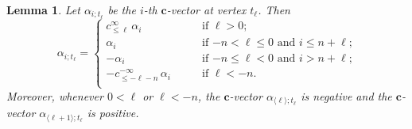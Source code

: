\documentclass[12pt]{amsart}
\newcommand{\bfc}{\mathbf{c}}
\newcommand{\cv}{\alpha}
\renewcommand{\mod}[1]{\langle {#1} \rangle}
\newcommand{\Zidx}{\ell}
\newtheorem{lemma}[theorem]{Lemma}
\theoremstyle{remark}
\numberwithin{equation}{section}
\numberwithin{figure}{section}
\begin{document}
\begin{lemma}
  \label{lemma:c-vectors}
  Let $\cv_{i;t_\Zidx}$ be the $i$-th $\bfc$-vector at vertex $t_\Zidx$.
  Then
  \begin{equation}
\label{eq:c-vectors}
    \cv_{i;t_\Zidx}
    =
    \begin{cases}
      c^\infty_{\le\Zidx}\, \alpha_i & \text{if $\Zidx>0$;}\\
      \alpha_i & \text{if $-n < \Zidx \leq 0$ and  $i\leq n+\Zidx$;} \\
      -\alpha_i & \text{if $-n\leq \Zidx < 0$ and $i > n+\Zidx$;} \\
      -c^{-\infty}_{\le-\Zidx-n}\, \alpha_i \qquad & \text{if $\Zidx<-n$.}\\
    \end{cases}
  \end{equation}
  Moreover, whenever $0 < \Zidx$ or $\Zidx < -n$, the $\bfc$-vector $\cv_{\mod{\Zidx};t_\Zidx}$ is negative and the $\bfc$-vector $\cv_{\mod{\Zidx+1};t_\Zidx}$ is positive.
\end{lemma}
\end{document}
